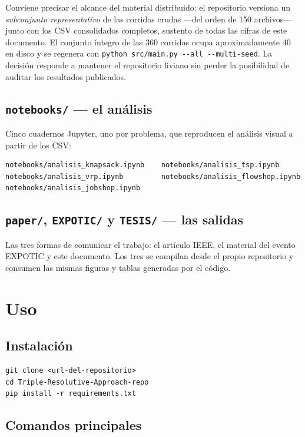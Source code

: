 Conviene precisar el alcance del material distribuido: el repositorio versiona
un \emph{subconjunto representativo} de las corridas crudas —del orden de 150
archivos— junto con los CSV consolidados completos, sustento de todas las cifras de este documento. El conjunto íntegro de las 360 corridas
ocupa aproximadamente \SI{40}{\mega\byte} en disco y se regenera con
\texttt{python src/main.py -{}-all -{}-multi-seed}. La decisión responde a
mantener el repositorio liviano sin perder la posibilidad de auditar los
resultados publicados.

\subsection{\texttt{notebooks/} --- el análisis}

Cinco cuadernos Jupyter, uno por problema, que reproducen el análisis visual
a partir de los CSV:

\begin{verbatim}
notebooks/analisis_knapsack.ipynb    notebooks/analisis_tsp.ipynb
notebooks/analisis_vrp.ipynb         notebooks/analisis_flowshop.ipynb
notebooks/analisis_jobshop.ipynb
\end{verbatim}

\subsection{\texttt{paper/}, \texttt{EXPOTIC/} y \texttt{TESIS/} --- las salidas}

Las tres formas de comunicar el trabajo: el artículo IEEE, el material
del evento EXPOTIC y este documento. Los tres se compilan desde el propio
repositorio y consumen las mismas figuras y tablas generadas por el código.

\section{Uso}

\subsection{Instalación}

\begin{verbatim}
git clone <url-del-repositorio>
cd Triple-Resolutive-Approach-repo
pip install -r requirements.txt
\end{verbatim}

\subsection{Comandos principales}

